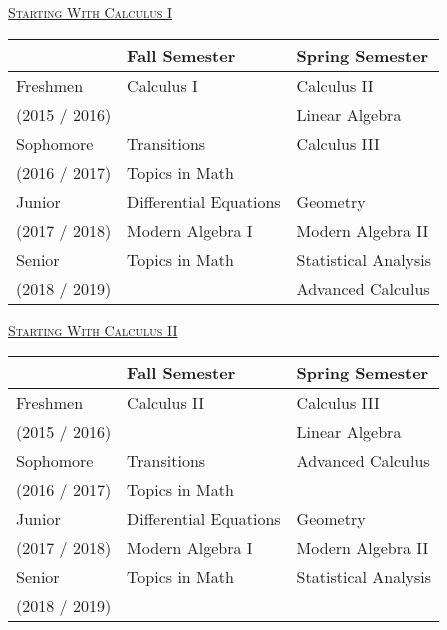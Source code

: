 \documentclass[letterpaper,10pt]{article}
\begin{document}
\begin{center}
\end{center}

\bigskip

\setlength{\extrarowheight}{2pt}
\begin{minipage}[t]{.45\textwidth}
\begin{center}
\underline{\scshape  \Large Starting With Calculus I}
\end{center}

\begin{tabular}{l|l|l}
	&{\bf Fall Semester} & {\bf Spring Semester}\\
\hline
Freshmen & Calculus I & Calculus II \\
\scriptsize (2015 / 2016) & & Linear Algebra\\[2pt]
\hline
Sophomore & Transitions & Calculus III\\
\scriptsize (2016 / 2017) & {\color{gray}Topics in Math} & \\[2pt]
\hline
Junior & Differential Equations & Geometry \\
\scriptsize (2017 / 2018)& Modern Algebra I & Modern Algebra II \\[2pt]
\hline
Senior &  {\color{gray}Topics in Math}  & Statistical Analysis\\
\scriptsize (2018 / 2019) &   & Advanced Calculus \\
\end{tabular}
\end{minipage}
\hspace{4em}
\begin{minipage}[t]{.45\textwidth}
\begin{center}
\underline{\scshape  \Large Starting With Calculus II} %
\end{center}

\begin{tabular}{l|l|l}
	&{\bf Fall Semester} & {\bf Spring Semester}\\
\hline
Freshmen & Calculus II & Calculus III \\
\scriptsize (2015 / 2016) &  & Linear Algebra \\[2pt]
\hline
Sophomore & Transitions & Advanced Calculus \\
\scriptsize (2016 / 2017)& {\color{gray}Topics in Math} &\\[2pt]
\hline
Junior & Differential Equations & Geometry \\
\scriptsize (2017 / 2018)& Modern Algebra I & Modern Algebra II\\[2pt]
\hline
Senior &  {\color{gray}Topics in Math} & Statistical Analysis\\
\scriptsize (2018 / 2019)& &
\end{tabular}
\end{minipage}
\end{document}
